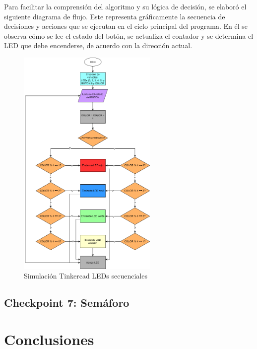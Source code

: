 \documentclass{article}
\begin{document}
Para facilitar la comprensión del algoritmo y su lógica de decisión, se elaboró el siguiente diagrama de flujo. Este representa gr\'aficamente la secuencia de decisiones y acciones que se ejecutan en el ciclo principal del programa. En él se observa cómo se lee el estado del botón, se actualiza el contador y se determina el LED que debe encenderse, de acuerdo con la dirección actual.

\begin{figure}[H]
    \centering
    \includegraphics[width=0.6\textwidth]{./img/ckpt_6_1.png}
    \caption{Simulación Tinkercad LEDs secuenciales}
    \label{fig:leds_secuenciales_flowchart}
\end{figure}

\subsection{Checkpoint 7: Sem\'aforo}

\section{Conclusiones}



\end{document}

